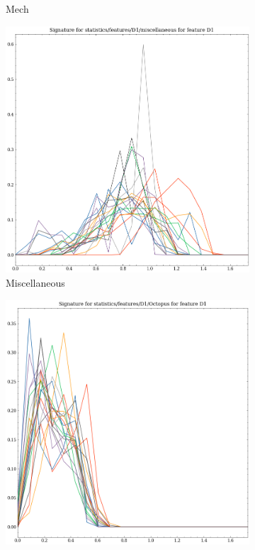\begin{figure}[t!p]
\begin{subfigure}[b]{0.23\textwidth}
        \caption{Mech}
        \label{fig:features-statistics-D1-r}    
    \end{subfigure}
    \hfill
    \begin{subfigure}[b]{0.23\textwidth}
        \includegraphics[width=\textwidth]{assets/feature_extraction/D1/miscellaneous.png}
        \caption{Miscellaneous}
        \label{fig:features-statistics-D1-s}    
    \end{subfigure}
    \hfill
    \begin{subfigure}[b]{0.23\textwidth}
        \includegraphics[width=\textwidth]{assets/feature_extraction/D1/Octopus.png}

\end{subfigure}
\end{figure}
